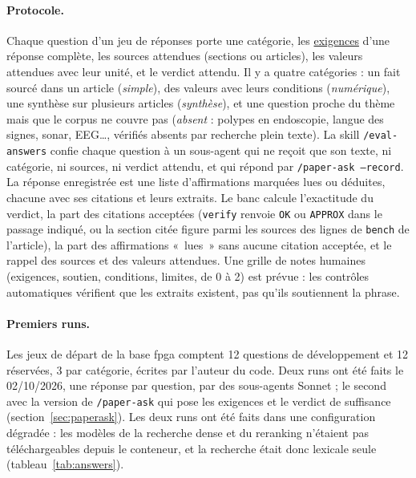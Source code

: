 \documentclass[11pt,a4paper]{article}
\newcommand{\cmd}[1]{\texttt{#1}}
\newcommand{\gl}[2]{\hyperlink{gl:#1}{\textcolor{glcolor}{#2}}}
\begin{document}
\paragraph{Protocole.} Chaque question d'un jeu de réponses porte une catégorie, les
\gl{exigence}{exigences} d'une réponse complète, les sources attendues (sections ou articles), les
valeurs attendues avec leur unité, et le verdict attendu. Il y a quatre catégories : un fait
sourcé dans un article (\emph{simple}), des valeurs avec leurs conditions
(\emph{numérique}), une synthèse sur plusieurs articles (\emph{synthèse}), et une question
proche du thème mais que le corpus ne couvre pas (\emph{absent} : polypes en endoscopie,
langue des signes, sonar, EEG\ldots, vérifiés absents par recherche plein texte). La skill
\cmd{/eval-answers} confie chaque question à un sous-agent qui ne reçoit que son texte, ni
catégorie, ni sources, ni verdict attendu, et qui répond par \cmd{/paper-ask --record}. La
réponse enregistrée est une liste d'affirmations marquées lues ou déduites, chacune avec ses
citations et leurs extraits. Le banc calcule l'exactitude du verdict, la part des citations
acceptées (\cmd{verify} renvoie \cmd{OK} ou \cmd{APPROX} dans le passage indiqué, ou la
section citée figure parmi les sources des lignes de \cmd{bench} de l'article), la part des
affirmations «~lues~» sans aucune citation acceptée, et le rappel des sources et des valeurs
attendues. Une grille de notes humaines (exigences, soutien, conditions, limites, de 0 à 2)
est prévue : les contrôles automatiques vérifient que les extraits existent, pas qu'ils
soutiennent la phrase.

\paragraph{Premiers runs.} Les jeux de départ de la base fpga comptent 12 questions de
développement et 12 réservées, 3 par catégorie, écrites par l'auteur du code. Deux runs ont
été faits le 02/10/2026, une réponse par question, par des sous-agents Sonnet ; le second
avec la version de \cmd{/paper-ask} qui pose les exigences et le verdict de suffisance
(section~\ref{sec:paperask}). Les deux runs ont été faits dans une configuration dégradée :
les modèles de la recherche dense et du reranking n'étaient pas téléchargeables depuis le
conteneur, et la recherche était donc lexicale seule (tableau~\ref{tab:answers}).
\end{document}
